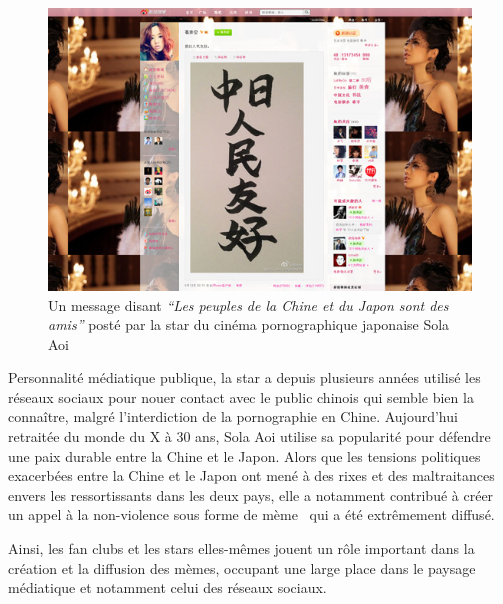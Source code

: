 \begin{description}
\begin{figure}[b]
    \centering
    \includegraphics[scale=0.7]{figures/chap2/chapitre2-img22.jpg}
    \caption[La star du X japonaise Sola Aoi sur Sina Weibo]{Un message disant\textit{ {\textquotedblleft}Les peuples de la Chine et du Japon sont des amis{\textquotedblright} }posté par la star du cinéma pornographique japonaise Sola Aoi}
    \label{fig:pornstar-weibo}
\end{figure}

Personnalité médiatique publique, la star a depuis plusieurs années utilisé les réseaux sociaux pour nouer contact avec le public chinois qui semble bien la conna\^itre, malgré l{\textquoteright}interdiction de la pornographie en Chine. Aujourd{\textquoteright}hui retraitée du monde du X à 30 ans, Sola Aoi utilise sa popularité pour défendre une paix durable entre la Chine et le Japon. Alors que les tensions politiques exacerbées entre la Chine et le Japon ont mené à des rixes et des maltraitances envers les ressortissants dans les deux pays, elle a notamment contribué à créer un appel à la non-violence sous forme de mème \ qui a été extrêmement diffusé.  


Ainsi, les fan clubs et les stars elles-mêmes jouent un rôle important dans la création et la diffusion des mèmes, occupant une large place dans le paysage médiatique et notamment celui des réseaux sociaux. 



\end{description}
